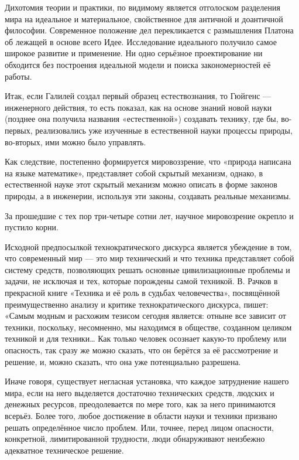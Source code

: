 \documentclass[a4paper]{article}
\begin{document}
{Дихотомия теории и практики, по видимому является отголоском разделения мира на идеальное и материальное, свойственное для античной и доантичной философии. Современное положение дел перекликается с размышления Платона об лежащей в основе всего Идее. Исследование идеального получило самое широкое развитие и применение. Ни одно серьёзное проектирование ни обходится без построения идеальной модели и поиска закономерностей её работы.

Итак, если Галилей создал первый образец естествознания, то Гюйгенс — инженерного действия, то есть показал, как на основе знаний новой науки (позднее она получила названия «естественной») создавать технику, где бы, во-первых, реализовались уже изученные в естественной науки процессы природы, во-вторых, ими можно было управлять.

Как следствие, постепенно формируется мировоззрение, что «природа написана на языке математике», представляет собой скрытый механизм, однако, в естественной науке этот скрытый механизм можно описать в форме законов природы, а в инженерии, используя эти законы, создавать реальные механизмы.

За прошедшие с тех пор три-четыре сотни лет, научное мировозрение окрепло и пустило корни.

Исходной предпосылкой технократического дискурса является убеждение в том, что современный мир — это мир технический и что техника представляет собой систему средств, позволяющих решать основные цивилизационные проблемы и задачи, не исключая и тех, которые порождены самой техникой. В. Рачков в прекрасной книге «Техника и её роль в судьбах человечества», посвящённой преимущественно анализу и критике технократического дискурса, пишет: «Самым модным и расхожим тезисом сегодня является: отныне все зависит от техники, поскольку, несомненно, мы находимся в обществе, созданном целиком техникой и для техники… Как только человек осознает какую-то проблему или опасность, так сразу же можно сказать, что он берётся за её рассмотрение и решение, и, можно сказать, что она уже потенциально разрешена.

Иначе говоря, существует негласная установка, что каждое затруднение нашего мира, если на него выделяется достаточно технических средств, людских и денежных ресурсов, преодолевается по мере того, как за него принимаются всерьёз. Более того, любое достижение в области науки и техники призвано решать определённое число проблем. Или, точнее, перед лицом опасности, конкретной, лимитированной трудности, люди обнаруживают неизбежно адекватное техническое решение.

}
\end{document}

